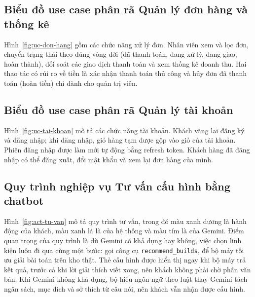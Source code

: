 \subsection{Biểu đồ use case phân rã Quản lý đơn hàng và thống kê}


Hình~\ref{fig:uc-don-hang} gồm các chức năng xử lý đơn. Nhân viên xem và lọc đơn, chuyển trạng thái theo đúng vòng đời (đã thanh toán, đang xử lý, đang giao, hoàn thành), đối soát các giao dịch thanh toán và xem thống kê doanh thu. Hai thao tác có rủi ro về tiền là xác nhận thanh toán thủ công và hủy đơn đã thanh toán (hoàn tiền) chỉ dành cho quản trị viên.

\subsection{Biểu đồ use case phân rã Quản lý tài khoản}


Hình~\ref{fig:uc-tai-khoan} mô tả các chức năng tài khoản. Khách vãng lai đăng ký và đăng nhập; khi đăng nhập, giỏ hàng tạm được gộp vào giỏ của tài khoản. Phiên đăng nhập được làm mới tự động bằng refresh token. Khách hàng đã đăng nhập có thể đăng xuất, đổi mật khẩu và xem lại đơn hàng của mình.

\subsection{Quy trình nghiệp vụ Tư vấn cấu hình bằng chatbot}


Hình~\ref{fig:act-tu-van} mô tả quy trình tư vấn, trong đó màu xanh dương là hành động của khách, màu xanh lá là của hệ thống và màu tím là của Gemini. Điểm quan trọng của quy trình là dù Gemini có khả dụng hay không, việc chọn linh kiện luôn đi qua cùng một bước: gọi công cụ \texttt{recommend\_builds}, để bộ máy tối ưu giải bài toán trên kho thật. Thẻ cấu hình được hiển thị ngay khi bộ máy trả kết quả, trước cả khi lời giải thích viết xong, nên khách không phải chờ phần văn bản. Khi Gemini không khả dụng, bộ hiểu ngôn ngữ theo luật thay Gemini tách ngân sách, mục đích và sở thích từ câu nói, nên khách vẫn nhận được cấu hình.

